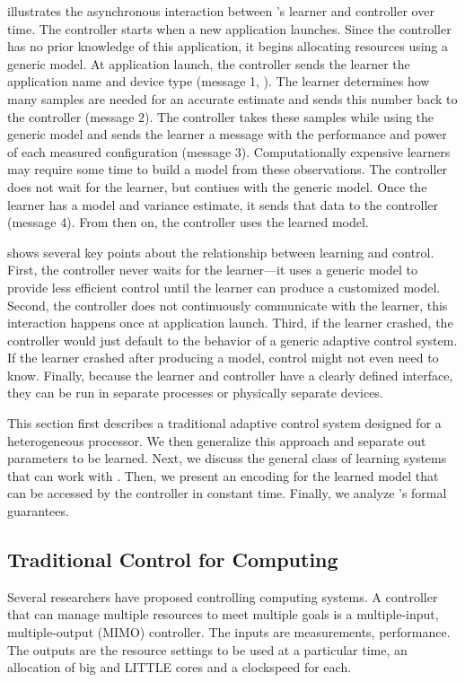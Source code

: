  illustrates the asynchronous interaction between
\SYSTEM{}'s learner and controller over time. The controller starts
when a new application launches.  Since the controller has no prior
knowledge of this application, it begins allocating resources using a
generic model.  At application launch, the controller sends the
learner the application name and device type (message 1,
).  The learner determines how many samples are
needed for an accurate estimate and sends this number back to the
controller (message 2).  The controller takes these samples while
using the generic model and sends the learner a message with the
performance and power of each measured configuration (message 3).
Computationally expensive learners may require some time to build a
model from these observations.  The controller does not wait for the
learner, but contiues with the generic model.  Once the learner has a
model and variance estimate, it sends that data to the controller
(message 4). From then on, the controller uses the learned model.

 shows several key points about the relationship
between learning and control.  First, the controller never waits for
the learner---it uses a generic model to provide less efficient
control until the learner can produce a customized model. Second, the
controller does not continuously communicate with the learner, this
interaction happens once at application launch.  Third, if the learner
crashed, the controller would just default to the behavior of a
generic adaptive control system.  If the learner crashed after
producing a model, control might not even need to know.  Finally,
because the learner and controller have a clearly defined interface,
they can be run in separate processes or physically separate devices.

This section first describes a traditional adaptive control system
designed for a heterogeneous processor.  We then generalize this
approach and separate out parameters to be learned.  Next, we discuss
the general class of learning systems that can work with \SYSTEM{}.
Then, we present an encoding for the learned model that can be
accessed by the controller in constant time.  Finally, we analyze
\SYSTEM{}'s formal guarantees.


\subsection{Traditional Control for Computing}
Several researchers have proposed controlling computing systems.  A
controller that can manage multiple resources to meet multiple goals
is a multiple-input, multiple-output (MIMO) controller.  The inputs
are measurements, \eg{} performance.  The outputs are the resource
settings to be used at a particular time, \eg{} an allocation of big
and LITTLE cores and a clockspeed for each.

